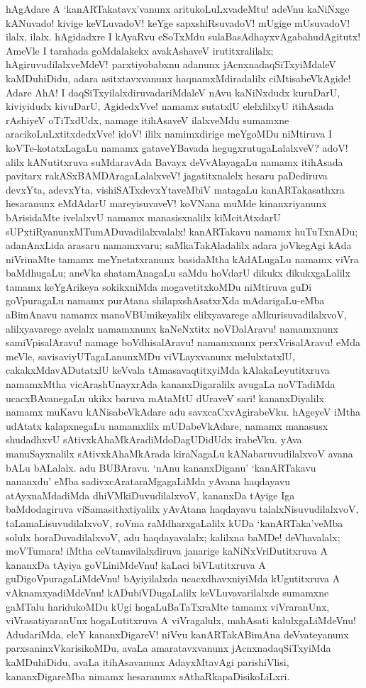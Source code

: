 \documentclass[11pt,a4size]{article}
\begin{document}
hAgAdare A `kanARTakatavx'vanunx aritukoLuLxvadeMtu! adeVnu kaNiNxge
kANuvado! kivige keVLuvadoV! keYge sapxshiRsuvadoV! mUgige mUsuvadoV!
ilalx, ilalx. hAgidadxre I kAyaRvu eSoTxMdu
sulaBasAdhayxvAgabahudAgitutx! AmeVle I tarahada goMdalakekx
avakAshaveV irutitxralilalx; hAgiruvudilalxveMdeV! parxtiyobabxnu
adanunx jAcnxnadaqSiTxyiMdaleV kaMDuhiDidu, adara asitxtavxvanunx
haqnamxMdiradalilx ciMtisabeVkAgide! Adare AhA! I
daqSiTxyilalxdiruvadariMdaleV nAvu kaNiNxdudx kuruDarU, kiviyidudx
kivuDarU, AgidedxVve! namamx sutatxlU elelxlilxyU itihAsada rAshiyeV
oTiTxdUdx, namage itihAsaveV ilalxveMdu sumamxne
aracikoLuLxtitxdedxVve! idoV! ililx namimxdirige meYgoMDu niMtiruva I
koVTe-kotatxLagaLu namamx gataveYBavada hegugxrutugaLalalxveV? adoV!
alilx kANutitxruva suMdaravAda Bavayx deVvAlayagaLu namamx itihAsada
pavitarx rakASxBAMDAragaLalalxveV! jagatitxnalelx hesaru paDediruva
devxYta, adevxYta, vishiSATxdevxYtaveMbiV matagaLu kanARTakasathxra
hesaranunx eMdAdarU mareyisuvaveV! koVNana muMde kinanxriyanunx
bArisidaMte ivelalxvU namamx manasisxnalilx kiMcitAtxdarU
sUPxtiRyanunxMTumADuvadilalxvalalx! kanARTakavu namamx huTuTxnADu;
adanAnxLida arasaru namamxvaru; saMkaTakAladalilx adara joVkegAgi kAda
niVrinaMte tamamx meYnetatxranunx basidaMtha kAdALugaLu namamx viVra
baMdhugaLu; aneVka shatamAnagaLu saMdu hoVdarU dikukx dikukxgaLalilx
tamamx keYgArikeya sokikxniMda mogavetitxkoMDu niMtiruva guDi
goVpuragaLu namamx purAtana shilapxshAsatxrXda mAdarigaLu-eMba
aBimAnavu namamx manoVBUmikeyalilx elilxyavarege aMkurisuvadilalxvoV,
alilxyavarege avelalx namamxnunx kaNeNxtitx noVDalAravu! namamxnunx
samiVpisalAravu! namage boVdhisalAravu! namamxnunx perxVrisalAravu!
eMda meVle, savisaviyUTagaLanunxMDu viVLayxvanunx melulxtatxlU,
cakakxMdavADutatxlU keVvala tAmasavaqtitxyiMda kAlakaLeyutitxruva
namamxMtha vicArashUnayxrAda kananxDigaralilx avugaLa noVTadiMda
ucacxBAvanegaLu ukikx baruva mAtaMtU dUraveV sari! kananxDiyalilx
namamx muKavu kANisabeVkAdare adu savxcaCxvAgirabeVku. hAgeyeV iMtha
udAtatx kalapxnegaLu namamxlilx mUDabeVkAdare, namamx manasusx
shudadhxvU sAtivxkAhaMkAradiMdoDagUDidUdx irabeVku. yAva
manuSayxnalilx sAtivxkAhaMkArada kiraNagaLu kANabaruvudilalxvoV avana
bALu bALalalx. adu BUBAravu. `nAnu kananxDiganu' `kanARTakavu
nananxdu' eMba sadivxcArataraMgagaLiMda yAvana haqdayavu
atAyxnaMdadiMda dhiVMkiDuvudilalxvoV, kananxDa tAyige Iga
baMdodagiruva viSamasithxtiyalilx yAvAtana haqdayavu
talalxNisuvudilalxvoV, taLamaLisuvudilalxvoV, roVma raMdharxgaLalilx
kUDa `kanARTaka'veMba solulx horaDuvadilalxvoV, adu haqdayavalalx;
kalilxna baMDe! deVhavalalx; moVTumara! iMtha ceVtanavilalxdiruva
janarige kaNiNxVriDutitxruva A kananxDa tAyiya goVLiniMdeVnu! kaLaci
biVLutitxruva A guDigoVpuragaLiMdeVnu! bAyiyilalxda ucacxdhavxniyiMda
kUgutitxruva A vAknamxyadiMdeVnu! kADubiVDugaLalilx keVLuvavarilalxde
sumamxne gaMTalu haridukoMDu kUgi hogaLuBaTaTxraMte tamamx
viVraranUnx, viVrasatiyaranUnx hogaLutitxruva A viVragalulx, mahAsati
kalulxgaLiMdeVnu! AdudariMda, eleY kananxDigareV! niVvu
kanARTakABimAna deVvateyanunx parxsaninxVkarisikoMDu, avaLa
amaratavxvanunx jAcnxnadaqSiTxyiMda kaMDuhiDidu, avaLa itihAsavanunx
AdayxMtavAgi parishiVlisi, kananxDigareMba nimamx hesaranunx
sAthaRkapaDisikoLiLxri.
\end{document}
